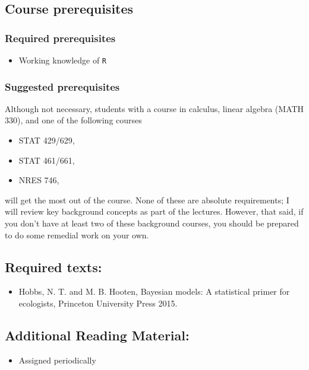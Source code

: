 \documentclass[11pt, a4paper]{article}
\begin{document}
\subsection*{Course prerequisites}
\subsubsection*{Required prerequisites}
\begin{itemize}
\item Working knowledge of \texttt{R}
\end{itemize}

\subsubsection*{Suggested prerequisites}
Although not necessary, students with a course in calculus, linear
algebra (MATH 330), and one of the following
courses
\begin{itemize}
\item STAT 429/629,
\item STAT 461/661,
\item NRES 746,
\end{itemize}
will get the most out of the course. None of these are absolute
requirements; I will review key background concepts as part of the
lectures. However, that said, if you don't have at least two of these
background courses, you should be prepared to do some remedial work on
your own.

\subsection*{Required texts:}
\begin{itemize}
\item Hobbs, N. T. and M. B. Hooten, Bayesian models: A statistical primer
for ecologists, Princeton University Press 2015.
\end{itemize}

\subsection*{Additional Reading Material:}
\begin{itemize}
\item Assigned periodically
\end{itemize}
\end{document}
